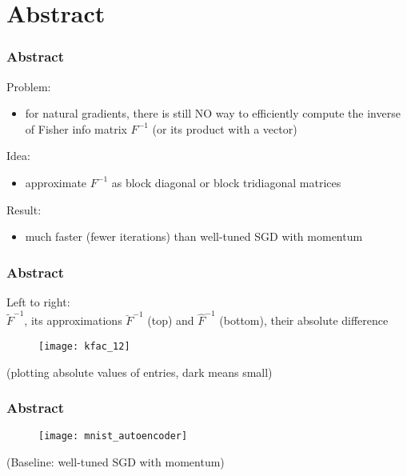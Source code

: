 \section{Abstract}

\begin{frame}
\frametitle{Abstract}

Problem:
\begin{itemize}
    \item for natural gradients, there is still NO way to efficiently compute
        the inverse of Fisher info matrix $F^{-1}$ (or its product with a vector)
\end{itemize}

Idea:
\begin{itemize}
    \item approximate $F^{-1}$ as block diagonal or block tridiagonal matrices
\end{itemize}

Result:
\begin{itemize}
    \item much faster (fewer iterations) than well-tuned SGD with momentum
\end{itemize}

\end{frame}

\begin{frame}
\frametitle{Abstract}
{\footnotesize
Left to right: \\
$\tilde{F}^{-1}$, its approximations $\breve{F}^{-1}$ (top) and $\hat{F}^{-1}$ (bottom), their absolute difference
}
\begin{figure}
    \centering
    \texttt{[image: kfac\_12]}
\end{figure}
(plotting absolute values of entries, dark means small)
\end{frame}

\begin{frame}
\frametitle{Abstract}
\begin{figure}
    \centering
    \texttt{[image: mnist\_autoencoder]}
\end{figure}
(Baseline: well-tuned SGD with momentum)
\end{frame}
